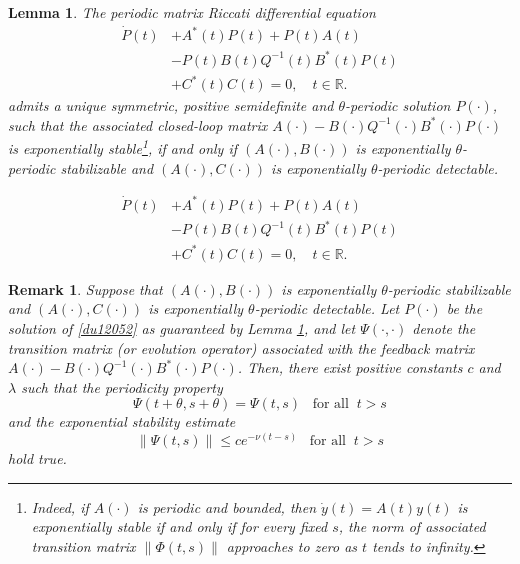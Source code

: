 \documentclass[10pt,a4paper]{amsart}
\newtheorem{lemma}{Lemma}
\newtheorem{remark}{Remark}
\begin{document}
	\begin{lemma}\label{ric}
		The periodic matrix Riccati differential equation
		\begin{equation}\label{du12052}
			\begin{split}
				\dot{P}(t)&+A^*(t)P(t)+P(t)A(t)\\
				&-P(t)B(t)Q^{-1}(t)B^*(t)P(t)\\
				&+C^*(t)C(t)=0,\quad t\in\mathbb{R}.
			\end{split}
		\end{equation}
		admits a unique symmetric, positive semidefinite and $\theta$-periodic
		solution $P(\cdot)$, such that the associated closed-loop matrix  $A(\cdot)-B(\cdot)Q^{-1}(\cdot)B^*(\cdot)P(\cdot)$ is exponentially stable\footnote{Indeed, if $A(\cdot)$ is periodic and bounded, then $\dot y(t)=A(t)y(t)$ is exponentially stable if and only if for every fixed $s$, the norm of associated transition matrix $\|\Phi(t,s)\|$ approaches to zero as $t$ tends to infinity.},
		if and only if
		$(A(\cdot),B(\cdot))$ is exponentially $\theta$-periodic stabilizable
		and $(A(\cdot), C(\cdot))$ is exponentially $\theta$-periodic detectable.
	\end{lemma}

		\begin{equation}
			\begin{split}
				\dot{P}(t)&+A^*(t)P(t)+P(t)A(t)\\
				&-P(t)B(t)Q^{-1}(t)B^*(t)P(t)\\
				&+C^*(t)C(t)=0,\quad t\in\mathbb{R}.
			\end{split}
		\end{equation}

	\begin{remark}\label{du120505}
		Suppose that $(A(\cdot),B(\cdot))$ is exponentially $\theta$-periodic stabilizable
		and $(A(\cdot), C(\cdot))$ is exponentially $\theta$-periodic detectable.
		Let $P(\cdot)$ be the solution of \eqref{du12052} as guaranteed by Lemma \ref{ric}, and let $\Psi(\cdot,\cdot)$ denote the transition matrix (or evolution operator) associated with the feedback matrix $A(\cdot)-B(\cdot)Q^{-1}(\cdot)B^*(\cdot)P(\cdot)$. 
		Then, there exist positive constants $c$ and $\lambda$ such that the periodicity property
		\begin{equation}\label{du12051}
			\Psi(t+\theta,s+\theta)=\Psi(t,s) \;\;\;\text{for all}\;\;t>s
		\end{equation}
		and the exponential stability estimate
		\begin{equation}
			\|\Psi(t,s)\|\leq ce^{-\nu (t-s)}\;\;\;\text{for all}\;\;t>s
		\end{equation}
		hold true.
	\end{remark}
\end{document}
